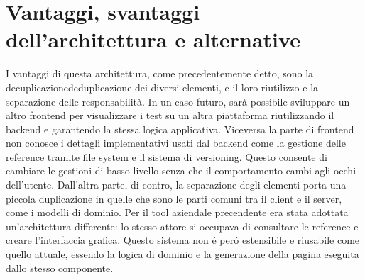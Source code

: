     \section{Vantaggi, svantaggi dell'architettura e alternative}
        I vantaggi di questa architettura, come precedentemente detto, sono la decuplicazionededuplicazione dei diversi elementi, e il loro riutilizzo e la separazione delle responsabilità.
        In un caso futuro, sarà possibile sviluppare un altro frontend per visualizzare i test su un altra piattaforma riutilizzando il backend e garantendo la stessa logica applicativa.
        Viceversa la parte di frontend non conosce i dettagli implementativi usati dal backend come la gestione delle reference tramite file system e il sistema di versioning.
        Questo consente di cambiare le gestioni di basso livello senza che il comportamento cambi agli occhi dell'utente.  
        Dall'altra parte, di contro, la separazione degli elementi porta una piccola duplicazione in quelle che sono le parti comuni tra il client e il server, come i modelli di dominio.
        Per il tool aziendale precendente era stata adottata un'architettura differente: lo stesso attore si occupava di consultare le reference e creare l'interfaccia grafica. 
        Questo sistema non \'e per\'o estensibile e riusabile come quello attuale, essendo la logica di dominio e la generazione della pagina eseguita dallo stesso componente.
